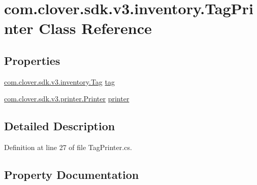 \hypertarget{classcom_1_1clover_1_1sdk_1_1v3_1_1inventory_1_1_tag_printer}{}\section{com.\+clover.\+sdk.\+v3.\+inventory.\+Tag\+Printer Class Reference}
\label{classcom_1_1clover_1_1sdk_1_1v3_1_1inventory_1_1_tag_printer}
\subsection*{Properties}
\begin{DoxyCompactItemize}
\item 
\hyperlink{classcom_1_1clover_1_1sdk_1_1v3_1_1inventory_1_1_tag}{com.\+clover.\+sdk.\+v3.\+inventory.\+Tag} \hyperlink{classcom_1_1clover_1_1sdk_1_1v3_1_1inventory_1_1_tag_printer_a3c80d9bcbf1b3a00b273b5567561397f}{tag}
\item 
\hyperlink{classcom_1_1clover_1_1sdk_1_1v3_1_1printer_1_1_printer}{com.\+clover.\+sdk.\+v3.\+printer.\+Printer} \hyperlink{classcom_1_1clover_1_1sdk_1_1v3_1_1inventory_1_1_tag_printer_abb74a7f3b4959d74db14ae651ecc70bd}{printer}
\end{DoxyCompactItemize}


\subsection{Detailed Description}


Definition at line 27 of file Tag\+Printer.\+cs.



\subsection{Property Documentation}
\mbox{\label{classcom_1_1clover_1_1sdk_1_1v3_1_1inventory_1_1_tag_printer_abb74a7f3b4959d74db14ae651ecc70bd}} 
